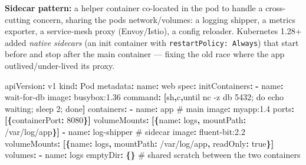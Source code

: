 \documentclass[11pt]{article}
\newenvironment{Shaded}{\begin{snugshade}}{\end{snugshade}}
\newcommand{\AttributeTok}[1]{\textcolor[rgb]{0.16,0.50,0.73}{#1}}
\newcommand{\CharTok}[1]{\textcolor[rgb]{0.24,0.68,0.91}{#1}}
\newcommand{\CommentTok}[1]{\textcolor[rgb]{0.48,0.49,0.49}{#1}}
\newcommand{\DecValTok}[1]{\textcolor[rgb]{0.96,0.45,0.00}{#1}}
\newcommand{\FunctionTok}[1]{\textcolor[rgb]{0.56,0.27,0.68}{#1}}
\newcommand{\KeywordTok}[1]{\textcolor[rgb]{0.81,0.81,0.76}{\textbf{#1}}}
\newcommand{\StringTok}[1]{\textcolor[rgb]{0.96,0.31,0.31}{#1}}
\begin{document}
\textbf{Sidecar pattern:} a helper container co-located in the pod to handle a cross-cutting concern, sharing the pod\textquotesingle s network/volumes: a logging shipper, a metrics exporter, a service-mesh proxy (Envoy/Istio), a config reloader. Kubernetes 1.28+ added \emph{native sidecars} (an init container with \texttt{restartPolicy:\ Always}) that start before and stop after the main container --- fixing the old race where the app outlived/under-lived its proxy.


\begin{Shaded}
\begin{Highlighting}[]
\FunctionTok{apiVersion}\KeywordTok{:}\AttributeTok{ v1}
\FunctionTok{kind}\KeywordTok{:}\AttributeTok{ Pod}
\FunctionTok{metadata}\KeywordTok{:}
\AttributeTok{  }\FunctionTok{name}\KeywordTok{:}\AttributeTok{ web}
\FunctionTok{spec}\KeywordTok{:}
\AttributeTok{  }\FunctionTok{initContainers}\KeywordTok{:}
\AttributeTok{    }\KeywordTok{{-}}\AttributeTok{ }\FunctionTok{name}\KeywordTok{:}\AttributeTok{ wait{-}for{-}db}
\AttributeTok{      }\FunctionTok{image}\KeywordTok{:}\AttributeTok{ busybox:1.36}
\AttributeTok{      }\FunctionTok{command}\KeywordTok{:}\AttributeTok{ }\KeywordTok{[}\StringTok{\textquotesingle{}sh\textquotesingle{}}\KeywordTok{,}\StringTok{\textquotesingle{}{-}c\textquotesingle{}}\KeywordTok{,}\StringTok{\textquotesingle{}until nc {-}z db 5432; do echo waiting; sleep 2; done\textquotesingle{}}\KeywordTok{]}
\AttributeTok{  }\FunctionTok{containers}\KeywordTok{:}
\AttributeTok{    }\KeywordTok{{-}}\AttributeTok{ }\FunctionTok{name}\KeywordTok{:}\AttributeTok{ app}\CommentTok{                       \# main}
\AttributeTok{      }\FunctionTok{image}\KeywordTok{:}\AttributeTok{ myapp:1.4}
\AttributeTok{      }\FunctionTok{ports}\KeywordTok{:}\AttributeTok{ }\KeywordTok{[\{}\FunctionTok{containerPort}\KeywordTok{:}\AttributeTok{ }\DecValTok{8080}\KeywordTok{\}]}
\AttributeTok{      }\FunctionTok{volumeMounts}\KeywordTok{:}\AttributeTok{ }\KeywordTok{[\{}\FunctionTok{name}\KeywordTok{:}\AttributeTok{ logs}\KeywordTok{,}\AttributeTok{ }\FunctionTok{mountPath}\KeywordTok{:}\AttributeTok{ /var/log/app}\KeywordTok{\}]}
\AttributeTok{    }\KeywordTok{{-}}\AttributeTok{ }\FunctionTok{name}\KeywordTok{:}\AttributeTok{ log{-}shipper}\CommentTok{               \# sidecar}
\AttributeTok{      }\FunctionTok{image}\KeywordTok{:}\AttributeTok{ fluent{-}bit:2.2}
\AttributeTok{      }\FunctionTok{volumeMounts}\KeywordTok{:}\AttributeTok{ }\KeywordTok{[\{}\FunctionTok{name}\KeywordTok{:}\AttributeTok{ logs}\KeywordTok{,}\AttributeTok{ }\FunctionTok{mountPath}\KeywordTok{:}\AttributeTok{ /var/log/app}\KeywordTok{,}\AttributeTok{ }\FunctionTok{readOnly}\KeywordTok{:}\AttributeTok{ }\CharTok{true}\KeywordTok{\}]}
\AttributeTok{  }\FunctionTok{volumes}\KeywordTok{:}
\AttributeTok{    }\KeywordTok{{-}}\AttributeTok{ }\FunctionTok{name}\KeywordTok{:}\AttributeTok{ logs}
\AttributeTok{      }\FunctionTok{emptyDir}\KeywordTok{:}\AttributeTok{ }\KeywordTok{\{\}}\CommentTok{                    \# shared scratch between the two containers}
\end{Highlighting}
\end{Shaded}
\end{document}
